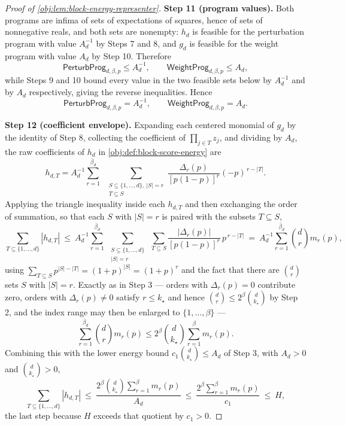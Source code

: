 \documentclass[11pt]{article}
\begin{document}
\begin{proof}[Proof of \cref{obj:lem:block-energy-representer}]
\textbf{Step 11 (program values).}
Both programs are infima of sets of expectations of squares, hence of sets of nonnegative reals, and both sets are nonempty: \(h_d\) is feasible for the perturbation program with value \(A_d^{-1}\) by Steps 7 and 8, and \(g_d\) is feasible for the weight program with value \(A_d\) by Step 10.  Therefore
\[
\mathsf{PerturbProg}_{d,\beta,p}\le A_d^{-1},
\qquad
\mathsf{WeightProg}_{d,\beta,p}\le A_d ,
\]
while Steps 9 and 10 bound every value in the two feasible sets below by \(A_d^{-1}\) and by \(A_d\) respectively, giving the reverse inequalities.  Hence
\[
\mathsf{PerturbProg}_{d,\beta,p}=A_d^{-1},
\qquad
\mathsf{WeightProg}_{d,\beta,p}=A_d .
\]

\textbf{Step 12 (coefficient envelope).}
Expanding each centered monomial of \(g_d\) by the identity of Step 8, collecting the coefficient of \(\prod_{j\in T}z_j\), and dividing by \(A_d\), the raw coefficients of \(h_d\) in \cref{obj:def:block-score-energy} are
\[
h_{d,T}
=A_d^{-1}\sum_{r=1}^{\bar\beta_d}\ \
\sum_{\substack{S\subseteq\{1,\ldots,d\},\ |S|=r\\ T\subseteq S}}
\frac{\Delta_r(p)}{[p(1-p)]^r}(-p)^{\,r-|T|}.
\]
Applying the triangle inequality inside each \(h_{d,T}\) and then exchanging the order of summation, so that each \(S\) with \(|S|=r\) is paired with the subsets \(T\subseteq S\),
\[
\sum_{T\subseteq\{1,\ldots,d\}}|h_{d,T}|
\ \le\
A_d^{-1}\sum_{r=1}^{\bar\beta_d}\ \sum_{\substack{S\subseteq\{1,\ldots,d\}\\ |S|=r}}\ \sum_{T\subseteq S}\frac{|\Delta_r(p)|}{[p(1-p)]^r}\,p^{\,r-|T|}
\ =\
A_d^{-1}\sum_{r=1}^{\bar\beta_d}\binom d r m_r(p),
\]
using \(\sum_{T\subseteq S}p^{|S|-|T|}=(1+p)^{|S|}=(1+p)^r\) and the fact that there are \(\binom d r\) sets \(S\) with \(|S|=r\). %
Exactly as in Step 3 — orders with \(\Delta_r(p)=0\) contribute zero, orders with \(\Delta_r(p)\ne0\) satisfy \(r\le k_\star\) and hence \(\binom d r\le2^\beta\binom{d}{k_\star}\) by Step 2, and the index range may then be enlarged to \(\{1,\ldots,\beta\}\) —
\[
\sum_{r=1}^{\bar\beta_d}\binom d r m_r(p)\le 2^\beta\binom{d}{k_\star}\sum_{r=1}^{\beta}m_r(p).
\]
Combining this with the lower energy bound \(c_1\binom{d}{k_\star}\le A_d\) of Step 3, with \(A_d>0\) and \(\binom{d}{k_\star}>0\),
\[
\sum_{T\subseteq\{1,\ldots,d\}}|h_{d,T}|
\ \le\
\frac{2^\beta\binom{d}{k_\star}\sum_{r=1}^{\beta}m_r(p)}{A_d}
\ \le\
\frac{2^\beta\sum_{r=1}^{\beta}m_r(p)}{c_1}
\ \le\ H,
\]
the last step because \(H\) exceeds that quotient by \(c_1>0\). %
\end{proof}
\end{document}
